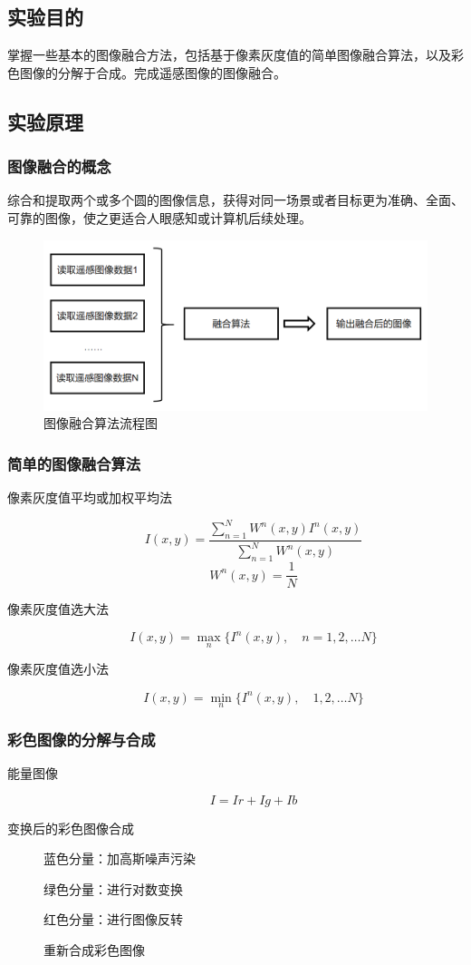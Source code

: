 \subsection{实验目的}
掌握一些基本的图像融合方法，包括基于像素灰度值的简单图像融合算法，以及彩色图像的分解于合成。完成遥感图像的图像融合。
\subsection{实验原理}
\subsubsection{图像融合的概念}
综合和提取两个或多个圆的图像信息，获得对同一场景或者目标更为准确、全面、可靠的图像，使之更适合人眼感知或计算机后续处理。
\begin{figure}[H]
	\centering
	\includegraphics[width=0.7\linewidth]{figure/fusion_flowchart.png}
	\caption{图像融合算法流程图}
	\label{fig:fusion_flowchart}
\end{figure}
\subsubsection{简单的图像融合算法}
\begin{description}
	\item[像素灰度值平均或加权平均法]
	\[ I(x, y)=\frac{\sum_{n=1}^{N}W^n(x, y)I^n(x, y)}{\sum_{n=1}^{N}W^n(x, y)} \]
	\[ W^n(x, y)=\frac{1}{N} \]
	\item[像素灰度值选大法] 
	\[ I(x, y)=\max_n\{I^n(x, y),\quad n=1,2,\dots N\} \]
	\item[像素灰度值选小法] 
	\[ I(x, y)=\min_n\{I^n(x, y),\quad 1,2,\dots N\} \]
\end{description}
\subsubsection{彩色图像的分解与合成}
\begin{description}
	\item[能量图像] 
	\[ I=Ir+Ig+Ib \]
	\item[变换后的彩色图像合成]
	蓝色分量：加高斯噪声污染
	
	绿色分量：进行对数变换
	
	红色分量：进行图像反转
	
	重新合成彩色图像
\end{description}
